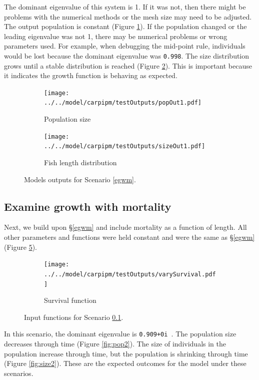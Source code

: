 \documentclass{article}[12pt]
\begin{document}
The dominant eigenvalue of this system is 1.
If it was not, then there might be problems with the numerical methods or the mesh size may need to be adjusted. 
The output population is constant (Figure \ref{fig:pop1}). 
If the population changed or the leading eigenvalue was not 1, there may be numerical problems or wrong parameters used.
For example, when debugging the mid-point rule, individuals would be lost because the dominant eigenvalue was \texttt{0.998}.
The size distribution grows until a stable distribution is reached (Figure \ref{fig:size1}).
This is important because it indicates the growth function is behaving as expected.


\begin{figure}[htbp]
	\centering
	\begin{subfigure}[b]{0.45\textwidth}
		\texttt{[image: ../../model/carpipm/testOutputs/popOut1.pdf]} 
		\caption{Population size} 
		\label{fig:pop1}
	\end{subfigure}
	\qquad
	\begin{subfigure}[b]{0.45\textwidth}
		\texttt{[image: ../../model/carpipm/testOutputs/sizeOut1.pdf]} 
		\caption{Fish length distribution} 
		\label{fig:size1}
	\end{subfigure}
   \caption{Models outputs for Scenario \ref{egwm}.}
   \label{fig:scn1out}
\end{figure}


\subsection{Examine growth with mortality}\label{egwim}

Next, we build upon \S \ref{egwm} and include mortality as a function of length.
All other parameters and functions were held constant and were the same as \S \ref{egwm} (Figure \ref{fig:scn1}).

\begin{figure}[htbp]
	\centering
	\begin{subfigure}[b]{0.45\textwidth}
		\texttt{[image: ../../model/carpipm/testOutputs/varySurvival.pdf]} 
		\caption{Survival function} 
		\label{fig:suv1}
	\end{subfigure}
   \caption{Input functions for Scenario \ref{egwim}.}
   \label{fig:scn1}
\end{figure}

In this scenario, the dominant eigenvalue is \texttt{0.909+0i }.
The population size decreases through time (Figure \ref{fig:pop2}).
The size of individuals in the population increase through time, but the population is shrinking through time (Figure \ref{fig:size2}).
These are the expected outcomes for the model under these scenarios. 
\end{document}
